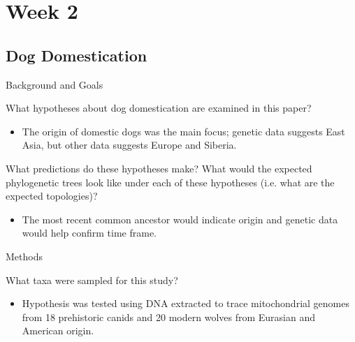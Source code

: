 \documentclass[12pt,a4paper]{article}
\begin{document}
\tableofcontents
\cleardoublepage
\fancyhead{}


\clearpage
\section*{Week 2}
{}
\subsection{Dog Domestication}
\begin{itemize}
    \item Background and Goals
        \begin{itemize}
            {\color{darklc} \item What hypotheses about dog domestication are examined in this paper?}
                \begin{itemize}
                    \item The origin of domestic dogs was the main focus; genetic data suggests East Asia, but other data suggests Europe and Siberia. 
                \end{itemize}
            {\color{darklc} \item  What predictions do these hypotheses make? What would the expected phylogenetic trees look like under each of these hypotheses (i.e. what are the expected topologies)?}
                \begin{itemize}
                    \item The most recent common ancestor would indicate origin and genetic data would help confirm time frame.
                \end{itemize}
        \end{itemize}
    \item Methods
        \begin{itemize}
            {\color{darklc} \item  What taxa were sampled for this study?} 
                \begin{itemize}
                    \item Hypothesis was tested using DNA extracted to trace mitochondrial genomes from 18 prehistoric canids and 20 modern wolves from Eurasian and American origin. 

\end{itemize}
\end{itemize}
\end{itemize}
\end{document}
